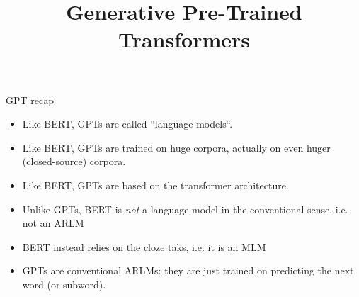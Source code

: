 



\newcommand{\titlefigure}{figure/73-gpt3.jpg}

\newcommand{\learninggoals}{
\item Recap GPT and the ideas behind standard language modeling
\item Understand the difference between fine-tuning and X-shot learning}

\def\myblue#1{\textcolor{texblue}{#1}}

\title{Generative Pre-Trained Transformers}
\date{}




\begin{frame}{GPT recap}

\vfill

  \begin{itemize}
\item Like BERT, GPTs are called ``language models``.
\item Like BERT, GPTs are trained on huge corpora, actually on even huger (closed-source) corpora.
\item Like BERT, GPTs are based on the transformer architecture.
\item Unlike GPTs, BERT is \textit{not} a language model in the conventional sense, i.e. not an ARLM
\item BERT instead relies on the cloze taks, i.e. it is an MLM
\item GPTs are conventional ARLMs: they are just trained on predicting the next word (or subword).
    \end{itemize}

\vfill

\end{frame}


